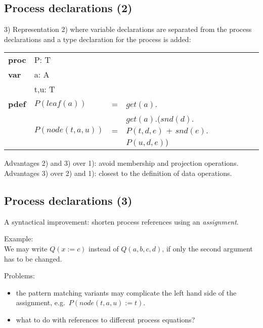 \documentclass{article}
\makeatletter
\newcommand{\frm}[1]{\mbox{\ensuremath{#1}}}
\newcommand{\f}[1]{\ensuremath{\mathit{#1}}}
\newcommand{\fa}[2]{\ensuremath{\f{#1}(#2)}}
\newcommand{\faaa}[4]{\ensuremath{\f{#1}(#2, #3, #4)}}
\newcommand{\faaaa}[5]{\ensuremath{\f{#1}(#2, #3, #4, #5)}}
\newenvironment{mCRL2}%
{\par\bigskip\noindent%
 \begin{tabular}{@{}>{\bf}p{2.3em}L@{\ }L@{\ }L@{\ }L@{\ }L@{\ }L@{\ }L@{\ }L}%
}%
{\end{tabular}\bigskip\par%
}
\makeatother
\begin{document}
\begin{slidetop}
\section*{Process declarations (2)}

3) Representation 2) where variable declarations are separated from the process declarations and a type declaration for the process is added:
\begin{mCRL2}
proc & P: T\\
var  & a: A\\
     & t,u: T\\
pdef & \fa{P}{\fa{leaf}{a}}         & = & \fa{get}{a}.\delta\\
     & \fa{P}{\faaa{node}{t}{a}{u}} & = & 
       \fa{get}{a}.(\fa{snd}{d}.\faaa{P}{t}{d}{e} + \fa{snd}{e}.\faaa{P}{u}{d}{e})    
\end{mCRL2}

\bigskip
Advantages 2) and 3) over 1): avoid membership and projection operations.\\
Advantages 3) over 2) and 1): closest to the definition of data operations.
\end{slidetop}

\begin{slidetop}
\section*{Process declarations (3)}

A syntactical improvement: shorten process references using an \emph{assignment}.

\bigskip
Example:\\
We may write \frm{\fa{Q}{x := c}} instead of \frm{\faaaa{Q}{a}{b}{c}{d}}, if only the second argument has to be changed.

\bigskip
Problems:
\begin{itemize}
\item the pattern matching variants may complicate the left hand side of the assignment, e.g.\ \frm{\fa{P}{\faaa{node}{t}{a}{u} := t}}.
\item what to do with references to different process equations?
\end{itemize}
\end{slidetop}
\end{document}

